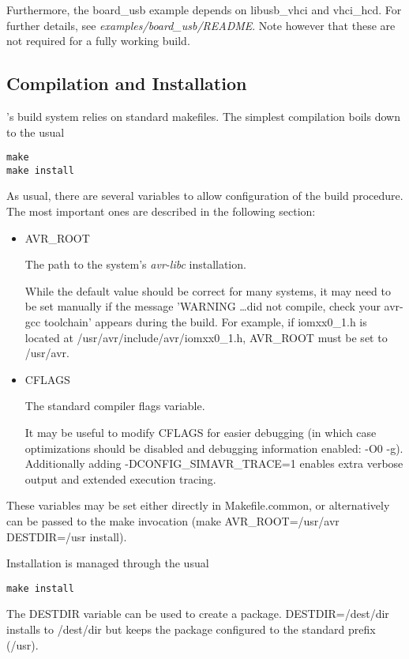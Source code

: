 Furthermore, the board\_usb example depends on libusb\_vhci and vhci\_hcd. For
further details, see \emph{examples/board\_usb/README}. Note however that these
are not required for a fully working \simavr build.

\subsection{Compilation and Installation}

\simavr's build system relies on standard makefiles. The simplest compilation
boils down to the usual

\begin{verbatim}
make
make install
\end{verbatim}

As usual, there are several variables to allow configuration of the build
procedure. The most important ones are described in the following section:

\begin{itemize}
\item AVR\_ROOT

The path to the system's \emph{avr-libc} installation.

While the default value
should be correct for many systems, it may need to be set manually if the
message 'WARNING \ldots did not compile, check your avr-gcc
toolchain' appears during the build. For example, if iomxx0\_1.h is located at
/usr/avr/include/avr/iomxx0\_1.h, AVR\_ROOT must be set to /usr/avr.

\item CFLAGS

The standard compiler flags variable.

It may be useful to modify CFLAGS for easier debugging (in which case
optimizations should be disabled and debugging information enabled: -O0 -g).
Additionally adding -DCONFIG\_SIMAVR\_TRACE=1 enables extra verbose output and
extended execution tracing.
\end{itemize}

These variables may be set either directly in Makefile.common, or alternatively
can be passed to the make invocation (make AVR\_ROOT=/usr/avr DESTDIR=/usr
install).

Installation is managed through the usual
\begin{verbatim}
make install
\end{verbatim}

The DESTDIR variable can be used to create a \simavr package. DESTDIR=/dest/dir
installs to /dest/dir but keeps the package configured to the standard prefix
(/usr).

